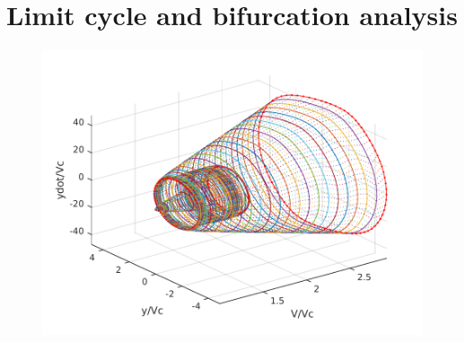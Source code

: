 \section{Limit cycle and bifurcation analysis}
\begin{figure}

\includegraphics{./plots/matcont.pdf}
\end{figure}




